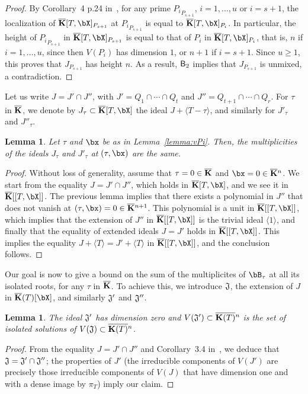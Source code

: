 \documentclass[12pt]{article}
\newtheorem{lemma}[definition]{Lemma}
\begin{document}
\begin{proof}
  By Corollary~4 p.24 in~\cite{Matsumura86}, for any prime
  ${P_i}_{P_{s+1}}$, $i=1,\dots,u$ or $i=s+1$, the localization of
  $\KKbar[T,\bX]_{P_{s+1}}$ at ${P_i}_{P_{s+1}}$ is equal to
  $\KKbar[T,\bX]_{P_{i}}$. In particular, the height of ${P_i}_{P_{s+1}}$
  in $\KKbar[T,\bX]_{P_{s+1}}$ is equal to that of $P_i$ in
  $\KKbar[T,\bX]_{P_{i}}$, that is, $n$ if $i=1,\dots,u$, since then
  $V(P_i)$ has dimension $1$, or $n+1$ if $i=s+1$. Since $u \ge 1$,
  this proves that $J_{P_{s+1}}$ has height $n$. As a result, $\mathsf{B}_2$ implies that $J_{P_{s+1}}$ is unmixed, a contradiction.
\end{proof}

Let us write $J=J' \cap J''$, with $J'=Q_1 \cap \cdots \cap Q_t$ and
$J''=Q_{t+1} \cap \cdots \cap Q_r$. For $\tau$ in $\overline{\mathbf{K}}$, we denote
by $J_\tau \subset \KKbar[T,\bX]$ the ideal $J + \langle T-\tau \rangle$,
and similarly for $J'_\tau$ and $ J''_\tau$.

\begin{lemma}\label{lemma:JJprime}
  Let $\tau$ and $\bx$ be as in Lemma~\ref{lemma:vPi}. Then, the
  multiplicities of the ideals $J_\tau$ and $J'_\tau$ at $(\tau,\bx)$
  are the same.
\end{lemma}
\begin{proof}
  Without loss of generality, assume that $\tau=0 \in \overline{\mathbf{K}}$ and
  $\bx=0 \in \KKbar{}^n$. We start from the equality $J=J' \cap J''$,
  which holds in $\KKbar[T,\bX]$, and we see it in $\KKbar[[T,\bX]]$.  The
  previous lemma implies that there exists a polynomial in $J''$ that
  does not vanish at $(\tau,\bx)=0 \in \KKbar{}^{n+1}$.  This polynomial
  is a unit in $\KKbar[[T,\bX]]$, which implies that the extension of
  $J''$ in $\KKbar[[T,\bX]]$ is the trivial ideal $\langle 1 \rangle$, and
  finally that the equality of extended ideals $J=J'$ holds in
  $\KKbar[[T,\bX]]$. This implies the equality $J+\langle T \rangle
  =J'+\langle T \rangle $ in $\KKbar[[T,\bX]]$, and the conclusion
  follows.
\end{proof}

Our goal is now to give a bound on the sum of the multiplicites of
$\bB_\tau$ at all its isolated roots, for any $\tau$ in $\overline{\mathbf{K}}$.  To
achieve this, we introduce $\frak{J}$, the extension of $J$ in
$\KKbar(T)[\bX]$, and similarly $\frak{J}'$ and ${\frak J}''$.

\begin{lemma}\label{lemma:dimJprime}
  The ideal $\frak{J}'$ has dimension zero and $V(\frak{J}') \subset
  \overline{\mathbf{K}(T)}{}^n$ is the set of isolated solutions of
  $V(\frak{J}) \subset \overline{\mathbf{K}(T)}{}^n$.
\end{lemma}
\begin{proof}
 From the equality $J=J' \cap J''$ and Corollary~3.4 in~\cite{AtMc},
 we deduce that $\frak{J}=\frak{J'} \cap \frak{J''}$; the properties
 of $J'$ (the irreducible components of $V(J')$ are precisely those
 irreducible components of $V(J)$ that have dimension one and with a
 dense image by $\pi_T$) imply our claim.
\end{proof}
\end{document}
